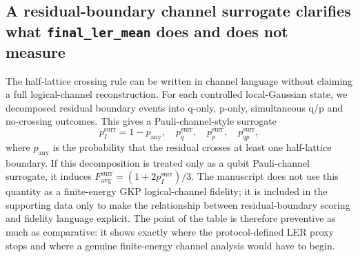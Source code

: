 \documentclass[11pt]{article}
\newcommand{\softwarehil}{controlled simulation}
\newcommand{\finalLER}{\texttt{final\_ler\_mean}}
\begin{document}
\begin{table}[t]
\centering
\scriptsize
\setlength{\tabcolsep}{3pt}
\caption{Controlled local-Gaussian nearest-syndrome, oracle-affine and
wrapped-Gaussian checks.  Entries are one-step residual MSE; lower is better.
The nearest-syndrome row applies the wrapped syndrome directly as a hard
correction and is included as a one-step nearest-lattice-style sanity
reference, not as a tuned finite-energy nearest-lattice decoder.  The table
uses the manuscript affine mapper for the affine rows and known-state
wrapped-Gaussian posterior rules for the posterior rows.  It is a sanity check
for estimator and decoder limits, not a formal \softwarehil{} benchmark,
sequence-level wrapped decoder comparison, holdout-drift test or hardware
measurement.}
\label{tab:controlled-oracle-affine}
\end{table}

\subsection{A residual-boundary channel surrogate clarifies what \finalLER{} does and does not measure}

The half-lattice crossing rule can be written in channel language without
claiming a full logical-channel reconstruction.  For each controlled
local-Gaussian state, we decomposed residual boundary events into q-only,
p-only, simultaneous q/p and no-crossing outcomes.  This gives a
Pauli-channel-style surrogate
\[
    p_I^{\mathrm{surr}}=1-p_{\mathrm{any}},\quad
    p_{q}^{\mathrm{surr}},\quad p_{p}^{\mathrm{surr}},\quad
    p_{qp}^{\mathrm{surr}},
\]
where \(p_{\mathrm{any}}\) is the probability that the residual crosses at
least one half-lattice boundary.  If this decomposition is treated only as a
qubit Pauli-channel surrogate, it induces
\(F_{\mathrm{avg}}^{\mathrm{surr}}=(1+2p_I^{\mathrm{surr}})/3\).  The
manuscript does not use this quantity as a finite-energy GKP logical-channel
fidelity; it is included in the supporting data only to make the relationship
between residual-boundary scoring and fidelity language explicit.
The point of the table is therefore preventive as much as comparative: it
shows exactly where the protocol-defined LER proxy stops and where a genuine
finite-energy channel analysis would have to begin.
\end{document}
